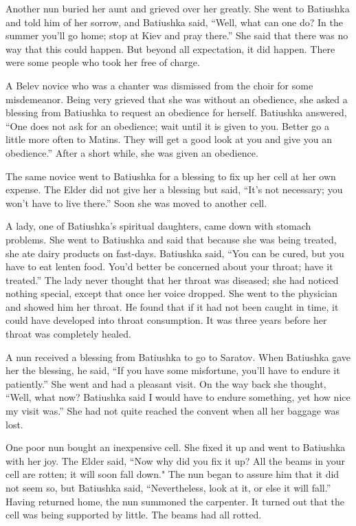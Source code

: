 Another nun buried her aunt and grieved over her greatly. She went to Batiushka and told him of her sorrow, and Batiushka said, “Well, what can one do? In the summer you'll go home; stop at Kiev and pray there.” She said that there was no way that this could happen. But beyond all expectation, it did happen. There were some people who took her free of charge.

A Belev novice who was a chanter was dismissed from the choir for some misdemeanor. Being very grieved that she was without an obedience, she asked a blessing from Batiushka to request an obedience for herself. Batiushka answered, “One does not ask for an obedience; wait until it is given to you. Better go a little more often to Matins. They will get a good look at you and give you an obedience.” After a short while, she was given an obedience.

The same novice went to Batiushka for a blessing to fix up her cell at her own expense. The Elder did not give her a blessing but said, “It's not necessary; you won't have to live there.” Soon she was moved to another cell.

A lady, one of Batiushka's spiritual daughters, came down with stomach problems. She went to Batiushka and said that because she was being treated, she ate dairy products on fast-days. Batiushka said, “You can be cured, but you have to eat lenten food. You'd better be concerned about your throat; have it treated.” The lady never thought that her throat was diseased; she had noticed nothing special, except that once her voice dropped. She went to the physician and showed him her throat. He found that if it had not been caught in time, it could have developed into throat consumption. It was three years before her throat was completely healed.

A nun received a blessing from Batiushka to go to Saratov. When Batiushka gave her the blessing, he said, “If you have some misfortune, you'll have to endure it patiently.” She went and had a pleasant visit. On the way back she thought, “Well, what now? Batiushka said I would have to endure something, yet how nice my visit was.” She had not quite reached the convent when all her baggage was lost.

One poor nun bought an inexpensive cell. She fixed it up and went to Batiushka with her joy. The Elder said, “Now why did you fix it up? All the beams in your cell are rotten; it will soon fall down." The nun began to assure him that it did not seem so, but Batiushka said, “Nevertheless, look at it, or else it will fall.” Having returned home, the nun summoned the carpenter. It turned out that the cell was being supported by little. The beams had all rotted.

